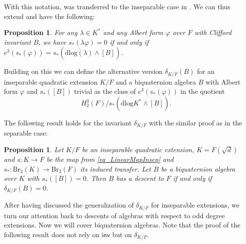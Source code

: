 \documentclass{amsart}
\newtheorem{proposition}[definition]{Proposition}
\numberwithin{equation}{section}
\newcommand{\BrTwo}{\mathrm{Br}_2}
\newcommand{\dlog}{\mathrm{dlog}}
\newcommand{\inv}{\mathsf{inv}}
\begin{document}
With this notation, \cite[Proposition 3.3]{BarryChapmanLaghribi_DescentBiquaternion} was transferred to the inseparable case in \cite[Proposition 5.1 (ii)]{AravireLaghribiORyan_TransferInsep}.
We can thus extend \cite[Proposition 3.4]{BarryChapmanLaghribi_DescentBiquaternion} and have the following:
\begin{proposition} \label{prop_TransferVanishesCondition}
	For any $\lambda \in K^\ast$ and any Albert form $\varphi$ over $F$ with Clifford invariant $B$, we have $s_\ast(\lambda\varphi) = 0$ if and only if $e^3(s_\ast(\varphi)) = s_\ast(\overline{\dlog(\lambda)} \wedge[B])$.
\end{proposition}

Building on this we can define the alternative version $\delta_{K/F}(B)$ for an inseparable quadratic extension $K/F$ and a biquaternion algebra $B$ with Albert form $\varphi$ and $s_\ast([B])$ trivial as the class of $e^3(s_\ast(\varphi))$ in the quotient
\[H_2^3(F) / s_\ast(\overline{\dlog K^\ast} \wedge [B]).\]

The following result holds for the invariant $\delta_{K / F}$ with the similar proof as in the separable case:

\begin{proposition} \label{prop_BiquaternionDescentIffDelta0}
	Let $K / F$ be an inseparable quadratic extension, $K = F(\sqrt d)$ and $s : K \to F$ be the map from \eqref{eq_LinearMapInsep} and $s_\ast : \BrTwo(K) \to \BrTwo(F)$ its induced transfer.
	Let $B$ be a biquaternion algebra over $K$ with $s_\ast([B]) = 0$.
	Then $B$ has a descent to $F$ if and only if $\delta_{K / F}(B) = 0$.
\end{proposition}

After having discussed the generalization of $\delta_{K / F}$ for inseparable extensions, we turn our attention back to descents of algebras with respect to odd degree extensions.
Now we will cover biquaternion algebras.
Note that the proof of the following result does not rely on $\inv$ but on $\delta_{K / F}$.
\end{document}
